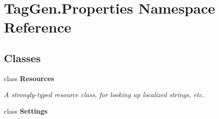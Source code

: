 \hypertarget{namespace_tag_gen_1_1_properties}{}\section{Tag\+Gen.\+Properties Namespace Reference}
\label{namespace_tag_gen_1_1_properties}
\subsection*{Classes}
\begin{DoxyCompactItemize}
\item 
class {\bfseries Resources}
\begin{DoxyCompactList}\small\item\em A strongly-\/typed resource class, for looking up localized strings, etc. \end{DoxyCompactList}\item 
class {\bfseries Settings}
\end{DoxyCompactItemize}
